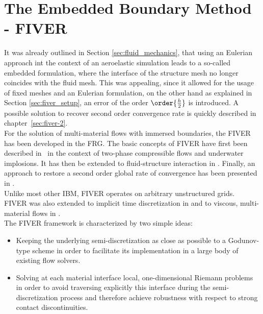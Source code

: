 \documentclass[../main.tex]{subfiles}
\begin{document}
\setlength{\delimitershortfall}{0pt}
\chapter{The Embedded Boundary Method - FIVER}\label{sec:embedded_boundary_method}
\minitoc


It was already outlined in Section \ref{sec:fluid_mechanics}, that using an Eulerian approach int the context of an aeroelastic simulation leads to a so-called embedded formulation, where the interface of the structure mesh no longer coincides with the fluid mesh. This was appealing, since it allowed for the usage of fixed meshes and an Eulerian formulation, on the other hand as  explained in Section \ref{sec:fiver_setup}, an error of the order $\order{\frac{h}{2}}$ is introduced. A possible solution to recover second order convergence rate is quickly described in chapter~\ref{sec:fiver-2}.\\
For the solution of multi-material flows with immersed boundaries, the \acf{FIVER} has been developed in the \acf{FRG}. The basic concepts of \ac{FIVER} have first been described in~\cite{Farhat2008} in the context of two-phase compressible flows and underwater implosions. It has then be extended to fluid-structure interaction in \cite{Wang2011a}. Finally, an approach to restore a second order global rate of convergence has been presented in \cite{Main2014}.\\
Unlike most other \ac{IBM}, \ac{FIVER} operates on arbitrary unstructured grids.\\
\ac{FIVER} was also extended to implicit time discretization in \cite{Main2014a} and to viscous, multi-material flows in \cite{Farhat2014}.\\
The \ac{FIVER} framework is characterized by two simple ideas:
\begin{itemize}
\item Keeping the underlying semi-discretization as close as possible to a Godunov-type scheme in order to facilitate its implementation in a large body of existing flow solvers.
\item Solving at each material interface local, one-dimensional Riemann problems in order to avoid traversing explicitly this interface during the semi-discretization process and therefore achieve robustness with respect to strong contact discontinuities.
\end{itemize}
\end{document}
